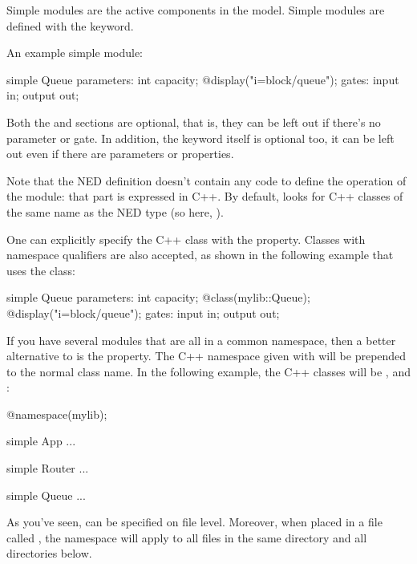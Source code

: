 Simple modules are the active components in the model.
Simple modules are defined with the  keyword.

An example simple module:

\begin{ned}
simple Queue
{
    parameters:
        int capacity;
        @display("i=block/queue");
    gates:
        input in;
        output out;
}
\end{ned}

Both the  and  sections are optional, that is,
they can be left out if there's no parameter or gate. In addition, the
 keyword itself is optional too, it can be left out
even if there are parameters or properties.

Note that the NED definition doesn't contain any code to define the
operation of the module: that part is expressed in C++. By default, {\opp}
looks for C++ classes of the same name as the NED type (so here, ).

One can explicitly specify the C++ class with the  property.
Classes with namespace qualifiers are also accepted, as shown in the following
example that uses the  class:

\begin{ned}
simple Queue
{
    parameters:
        int capacity;
        @class(mylib::Queue);
        @display("i=block/queue");
    gates:
        input in;
        output out;
}
\end{ned}

If you have several modules that are all in a common namespace, then a
better alternative to  is the  property. The
C++ namespace given with  will be prepended to the normal
class name. In the following example, the C++ classes will be
,  and :

\begin{ned}
@namespace(mylib);

simple App {
   ...
}

simple Router {
   ...
}

simple Queue {
   ...
}
\end{ned}

As you've seen,  can be specified on file level. Moreover,
when placed in a file called , the namespace will apply to
all files in the same directory and all directories below.

